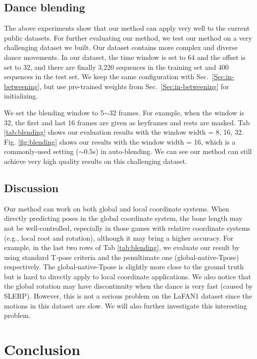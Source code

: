 \documentclass[10pt,twocolumn,letterpaper]{article}
\begin{document}
\subsection{Dance blending}

The above experiments show that our method can apply very well to the current public datasets. For further evaluating our method, we test our method on a very challenging dataset we built. Our dataset contains more complex and diverse dance movements. In our dataset, the time window is set to 64 and the offset is set to 32, and there are finally 3,220 sequences in the training set and 400 sequences in the test set. We keep the same configuration with Sec.~\ref{Sec:in-betweening}, but use pre-trained weights from Sec.~\ref{Sec:in-betweening} for initializing.

We set the blending window to 5$\sim$32 frames. For example, when the window is 32, the first and last 16 frames are given as keyframes and rests are masked. Tab \ref{tab:blending} shows our evaluation results with the window width = 8, 16, 32. Fig. \ref{fig:blending} shows our results with the window width = 16, which is a commonly-used setting ($\sim 0.5$s) in auto-blending. We can see our method can still achieve very high quality results on this challenging dataset.

\subsection{Discussion}

Our method can work on both global and local coordinate systems. When directly predicting poses in the global coordinate system, the bone length may not be well-controlled, especially in those games with relative coordinate systems (e.g., local root and rotation), although it may bring a higher accuracy. For example, in the last two rows of Tab \ref{tab:blending}, we evaluate our result by using standard T-pose criteria and the penultimate one (global-native-Tpose) respectively. The global-native-Tpose is slightly more close to the ground truth but is hard to directly apply to local coordinate applications. We also notice that the global rotation may have discontinuity when the dance is very fast (caused by SLERP). However, this is not a serious problem on the LaFAN1 dataset since the motions in this dataset are slow. We will also further investigate this interesting problem.

\section{Conclusion}
\end{document}
